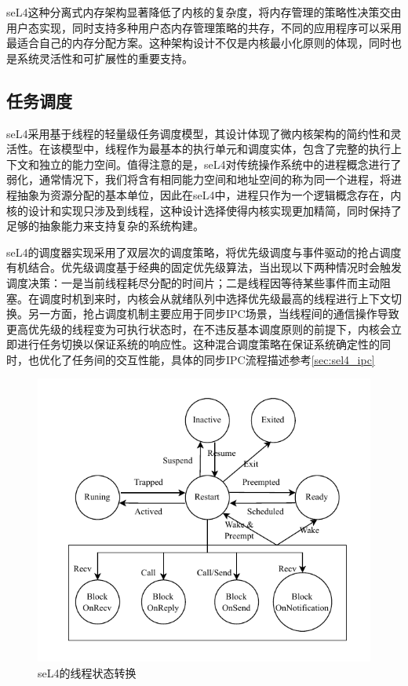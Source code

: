 seL4这种分离式内存架构显著降低了内核的复杂度，将内存管理的策略性决策交由用户态实现，同时支持多种用户态内存管理策略的共存，不同的应用程序可以采用最适合自己的内存分配方案。这种架构设计不仅是内核最小化原则的体现，同时也是系统灵活性和可扩展性的重要支持。


\subsection{任务调度}
\label{sec:sel4_task}

seL4采用基于线程的轻量级任务调度模型，其设计体现了微内核架构的简约性和灵活性。在该模型中，线程作为最基本的执行单元和调度实体，包含了完整的执行上下文和独立的能力空间。值得注意的是，seL4对传统操作系统中的进程概念进行了弱化，通常情况下，我们将含有相同能力空间和地址空间的称为同一个进程，将进程抽象为资源分配的基本单位，因此在seL4中，进程只作为一个逻辑概念存在，内核的设计和实现只涉及到线程，这种设计选择使得内核实现更加精简，同时保持了足够的抽象能力来支持复杂的系统构建。

seL4的调度器实现采用了双层次的调度策略，将优先级调度与事件驱动的抢占调度有机结合。优先级调度基于经典的固定优先级算法，当出现以下两种情况时会触发调度决策：一是当前线程耗尽分配的时间片；二是线程因等待某些事件而主动阻塞。在调度时机到来时，内核会从就绪队列中选择优先级最高的线程进行上下文切换。另一方面，抢占调度机制主要应用于同步IPC场景，当线程间的通信操作导致更高优先级的线程变为可执行状态时，在不违反基本调度原则的前提下，内核会立即进行任务切换以保证系统的响应性。这种混合调度策略在保证系统确定性的同时，也优化了任务间的交互性能，具体的同步IPC流程描述参考\ref{sec:sel4_ipc}

\begin{figure}[htbp]
  \centering
  \includegraphics{figures/seL4_thread_state.drawio.pdf}
  \caption{seL4的线程状态转换}\label{fig:seL4_thread_state}
\end{figure}

